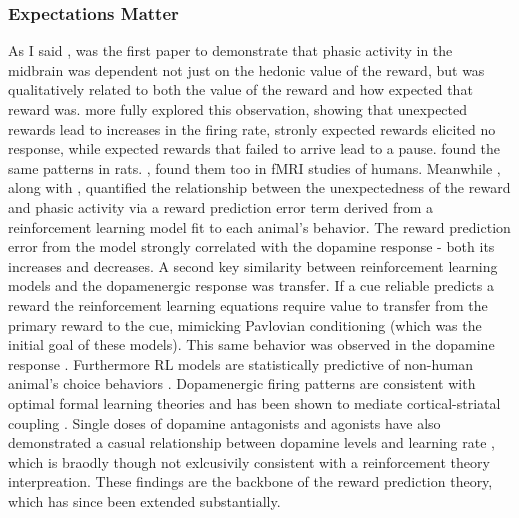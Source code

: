 \documentclass[doc,12pt]{apa}        %
\begin{document}
\subsubsection{Expectations Matter} %
\label{sub:the_classics}
As I said , was the first paper to demonstrate that phasic activity in the midbrain was dependent not just on the hedonic value of the reward, but was qualitatively related to both the value of the reward and how expected that reward was.   more fully explored this observation, showing that unexpected rewards lead to increases in the firing rate, stronly expected rewards elicited no response, while expected rewards that failed to arrive lead to a pause.   found the same patterns in rats. , found them too in fMRI studies of humans.  Meanwhile , along with , quantified the relationship between the unexpectedness of the reward and phasic activity via a reward prediction error term derived from a reinforcement learning model fit to each animal's behavior. The reward prediction error from the model strongly correlated with the dopamine response - both its increases and decreases.  A second key similarity between reinforcement learning models and the dopamenergic response was transfer.  If a cue reliable predicts a reward the reinforcement learning equations require value to transfer from the primary reward to the cue, mimicking Pavlovian conditioning (which was the initial goal of these models).  This same behavior was observed in the dopamine response \cite{Roesch:2007p2519, McClure:2003p3346}. Furthermore RL models are statistically predictive of non-human animal's choice behaviors \cite{Hampton:2007p2983}. Dopamenergic firing patterns are consistent with optimal formal learning theories \cite{Waelti:2001p6523} and has been shown to mediate cortical-striatal coupling \cite{denOuden:2010p7203}.  Single doses of dopamine antagonists and agonists have also demonstrated a casual relationship between dopamine levels and learning rate \cite{Pizzagalli:2008p6521, Diaconescu:2010p7631}, which is braodly though not exlcusivily consistent with a reinforcement theory interpreation.  These findings are the backbone of the reward prediction theory, which has since been extended substantially.  
\end{document}
